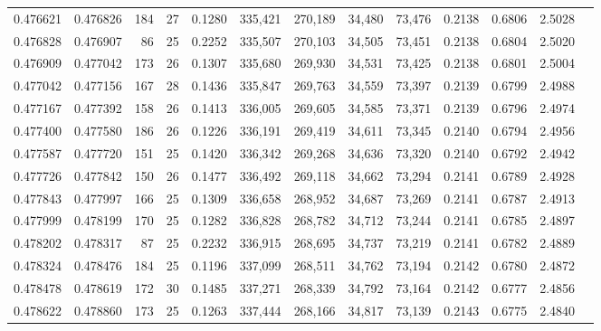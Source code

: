 \begin{tabular}{rrrrrrrrrrrrr}
0.476621 & 0.476826 &   184 &  27 &                                     0.1280 & 335,421 & 270,189 &  34,480 &  73,476 & 0.2138 & 0.6806 & 2.5028 \\
0.476828 & 0.476907 &    86 &  25 &                                     0.2252 & 335,507 & 270,103 &  34,505 &  73,451 & 0.2138 & 0.6804 & 2.5020 \\
0.476909 & 0.477042 &   173 &  26 &                                     0.1307 & 335,680 & 269,930 &  34,531 &  73,425 & 0.2138 & 0.6801 & 2.5004 \\
0.477042 & 0.477156 &   167 &  28 &                                     0.1436 & 335,847 & 269,763 &  34,559 &  73,397 & 0.2139 & 0.6799 & 2.4988 \\
0.477167 & 0.477392 &   158 &  26 &                                     0.1413 & 336,005 & 269,605 &  34,585 &  73,371 & 0.2139 & 0.6796 & 2.4974 \\
0.477400 & 0.477580 &   186 &  26 &                                     0.1226 & 336,191 & 269,419 &  34,611 &  73,345 & 0.2140 & 0.6794 & 2.4956 \\
0.477587 & 0.477720 &   151 &  25 &                                     0.1420 & 336,342 & 269,268 &  34,636 &  73,320 & 0.2140 & 0.6792 & 2.4942 \\
0.477726 & 0.477842 &   150 &  26 &                                     0.1477 & 336,492 & 269,118 &  34,662 &  73,294 & 0.2141 & 0.6789 & 2.4928 \\
0.477843 & 0.477997 &   166 &  25 &                                     0.1309 & 336,658 & 268,952 &  34,687 &  73,269 & 0.2141 & 0.6787 & 2.4913 \\
0.477999 & 0.478199 &   170 &  25 &                                     0.1282 & 336,828 & 268,782 &  34,712 &  73,244 & 0.2141 & 0.6785 & 2.4897 \\
0.478202 & 0.478317 &    87 &  25 &                                     0.2232 & 336,915 & 268,695 &  34,737 &  73,219 & 0.2141 & 0.6782 & 2.4889 \\
0.478324 & 0.478476 &   184 &  25 &                                     0.1196 & 337,099 & 268,511 &  34,762 &  73,194 & 0.2142 & 0.6780 & 2.4872 \\
0.478478 & 0.478619 &   172 &  30 &                                     0.1485 & 337,271 & 268,339 &  34,792 &  73,164 & 0.2142 & 0.6777 & 2.4856 \\
0.478622 & 0.478860 &   173 &  25 &                                     0.1263 & 337,444 & 268,166 &  34,817 &  73,139 & 0.2143 & 0.6775 & 2.4840 \\

\end{tabular}
